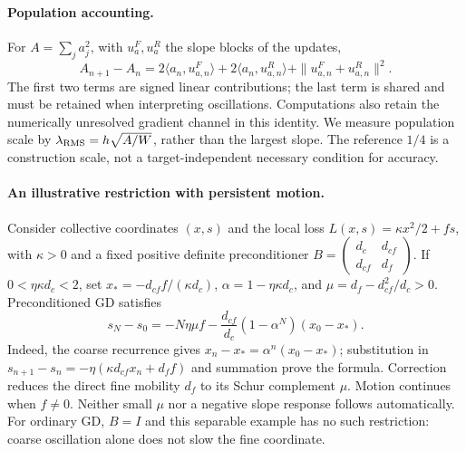 \paragraph{Population accounting.}
For $A=\sum_j a_j^2$, with $u_a^F,u_a^R$ the slope blocks of the updates,
\begin{equation}
 A_{n+1}-A_n=2\langle a_n,u_{a,n}^F\rangle
 +2\langle a_n,u_{a,n}^R\rangle
 +\|u_{a,n}^F+u_{a,n}^R\|^2.
 \label{eq:feedback-population}
\end{equation}
The first two terms are signed linear contributions; the last term is
shared and must be retained when interpreting oscillations. Computations
also retain the numerically unresolved gradient channel in this identity.
We measure population scale by $\lambda_{\rm RMS}=h\sqrt{A/W}$, rather than
the largest slope. The reference $1/4$ is a construction scale, not a
target-independent necessary condition for accuracy.

\paragraph{An illustrative restriction with persistent motion.}
Consider collective coordinates $(x,s)$ and the local loss
$L(x,s)=\kappa x^2/2+fs$, with $\kappa>0$ and a fixed positive definite
preconditioner
$B=\left(\begin{smallmatrix}d_c&d_{cf}\\d_{cf}&d_f\end{smallmatrix}\right)$.
If $0<\eta\kappa d_c<2$, set
$x_*=-d_{cf}f/(\kappa d_c)$, $\alpha=1-\eta\kappa d_c$, and
$\mu=d_f-d_{cf}^2/d_c>0$. Preconditioned GD satisfies
\begin{equation}
 s_N-s_0=-N\eta\mu f
 -\frac{d_{cf}}{d_c}(1-\alpha^N)(x_0-x_*).
 \label{eq:feedback-mobility}
\end{equation}
Indeed, the coarse recurrence gives $x_n-x_*=\alpha^n(x_0-x_*)$;
substitution in $s_{n+1}-s_n=-\eta(\kappa d_{cf}x_n+d_ff)$ and summation
prove the formula. Correction reduces the direct fine mobility $d_f$ to
its Schur complement $\mu$. Motion continues when $f\ne0$.
Neither small $\mu$ nor a negative slope response follows automatically.
For ordinary GD, $B=I$ and this separable example has no such restriction:
coarse oscillation alone does not slow the fine coordinate.

